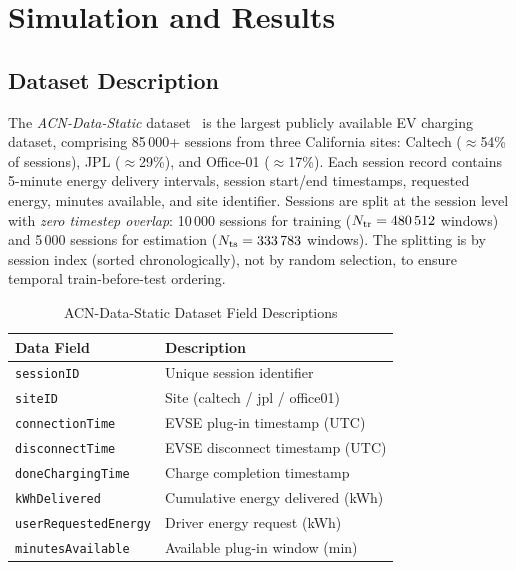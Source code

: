 \documentclass[journal]{IEEEtran}
\begin{document}
\section{Simulation and Results}
\label{sec:results}

\subsection{Dataset Description}

The \textit{ACN-Data-Static} dataset~\cite{acn2019} is the largest
publicly available EV charging dataset, comprising 85\,000+
sessions from three California sites: Caltech ($\approx$54\%
of sessions), JPL ($\approx$29\%), and Office-01 ($\approx$17\%).
Each session record contains 5-minute energy delivery intervals,
session start/end timestamps, requested energy, minutes available,
and site identifier.
Sessions are split at the session level with \emph{zero timestep
overlap}: 10\,000 sessions for training
($N_{\rm tr}=480\,512$ windows) and 5\,000 sessions for
estimation ($N_{\rm ts}=333\,783$ windows).
The splitting is by session index (sorted chronologically), not
by random selection, to ensure temporal train-before-test ordering.

\begin{table}[!t]
\caption{ACN-Data-Static Dataset Field Descriptions}
\label{tab:dataset}
\centering
\begin{tabular}{|p{2.5cm}|p{5.1cm}|}
\hline
\textbf{Data Field} & \textbf{Description} \\
\hline
\texttt{sessionID}       & Unique session identifier \\
\texttt{siteID}          & Site (caltech / jpl / office01) \\
\texttt{connectionTime}  & EVSE plug-in timestamp (UTC) \\
\texttt{disconnectTime}  & EVSE disconnect timestamp (UTC) \\
\texttt{doneChargingTime}& Charge completion timestamp \\
\texttt{kWhDelivered}    & Cumulative energy delivered (kWh) \\
\texttt{userRequestedEnergy} & Driver energy request (kWh) \\
\texttt{minutesAvailable}& Available plug-in window (min) \\
\hline
\end{tabular}
\end{table}
\end{document}
